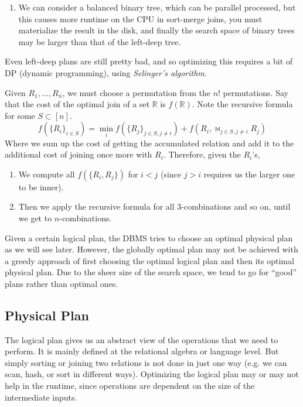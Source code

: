 \documentclass{article}
\begin{document}
\begin{example}
\begin{enumerate}
          \item We can consider a balanced binary tree, which can be parallel processed, but this causes more runtime on the CPU in sort-merge joins, you must materialize the result in the disk, and finally the search space of binary trees may be larger than that of the left-deep tree. 
        \end{enumerate}
      \end{example}

      Even left-deep plans are still pretty bad, and so optimizing this requires a bit of DP (dynamic programming), using \textit{Selinger's algorithm}. 

      \begin{algo}
        Given $R_1, \ldots, R_n$, we must choose a permutation from the $n!$ permutations. Say that the cost of the optimal join of a set $\mathbb{R}$ is $f(\mathbb{R})$. Note the recursive formula for some $S \subset [n]$. 
        \begin{equation}
          f(\{R_i\}_{i \in S}) = \min_i f(\{R_j\}_{j \in S, j \neq i}) + f(R_i, \bowtie_{j \in S, j \neq i} R_j) 
        \end{equation}
        Where we sum up the cost of getting the accumulated relation and add it to the additional cost of joining once more with $R_i$. Therefore, given the $R_i$'s, 
        \begin{enumerate}
          \item We compute all $f(\{R_i, R_j\})$ for $i < j$ (since $j > i$ requires us the larger one to be inner). 
          \item Then we apply the recursive formula for all 3-combinations and so on, until we get to $n$-combinations. 
        \end{enumerate}
      \end{algo}

      Given a certain logical plan, the DBMS tries to choose an optimal physical plan as we will see later. However, the globally optimal plan may not be achieved with a greedy approach of first choosing the optimal logical plan and then its optimal physical plan. Due to the sheer size of the search space, we tend to go for ``good'' plans rather than optimal ones. 

  \subsection{Physical Plan}

      The logical plan gives us an abstract view of the operations that we need to perform. It is mainly defined at the relational algebra or language level. But simply sorting or joining two relations is not done 
      in just one way (e.g. we can scan, hash, or sort in different ways). Optimizing the logical plan may or may not help in the runtime, since operations are dependent on the size of the intermediate inputs. 
\end{document}

